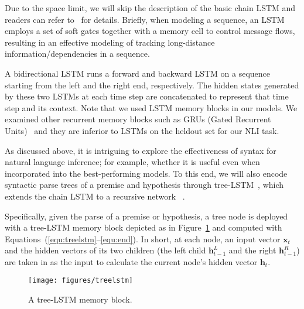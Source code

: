 \documentclass[11pt,a4paper]{article}
\newcommand{\vect}[1]{\mathbf{#1}}
\begin{document}
Due to the space limit, we will skip the description of the basic chain LSTM and readers can refer to~\citet{DBLP:journals/neco/HochreiterS97} for details. Briefly, when modeling a sequence, an LSTM employs a set of soft gates together with a memory cell to control message flows, resulting in an effective modeling of tracking long-distance information/dependencies in a sequence. 

A bidirectional LSTM runs a forward and backward LSTM on a sequence starting from the left and the right end, respectively. The hidden states generated by these two LSTMs at each time step are concatenated to represent that time step and its context. Note that we used LSTM memory blocks in our models. We examined other recurrent memory blocks such as GRUs (Gated Recurrent Units)~\citep{DBLP:conf/ssst/ChoMBB14} and they are inferior to LSTMs on the heldout set for our NLI task. 

As discussed above, it is intriguing to explore the effectiveness of syntax for natural language inference; for example, whether it is useful even when incorporated into the best-performing models. To this end, we will also encode syntactic parse trees of a premise and hypothesis through tree-LSTM~\citep{DBLP:conf/icml/ZhuSG15,Tai:P15-1150,Le:S15-1002}, which extends the chain LSTM to a recursive network ~\citep{DBLP:conf/icml/SocherLNM11}.

Specifically, given the parse of a premise or hypothesis, a tree node is deployed with a tree-LSTM memory block depicted as in Figure~\ref{fig:tree-lstm} and computed with Equations~(\ref{equ:treelstm}--\ref{equ:end}). In short, at each node, an input vector $\vect{x}_t$ and the hidden vectors of its two children (the left child $\vect{h}_{t-1}^L$ and the right $\vect{h}_{t-1}^R$) are taken in as the input to calculate the current node's hidden vector $\vect{h}_t$. 

\begin{figure}[!htb]
	\centering
	\texttt{[image: figures/treelstm]}
	\caption{A tree-LSTM memory block.}
    \label{fig:tree-lstm} 
\end{figure}
\end{document}
